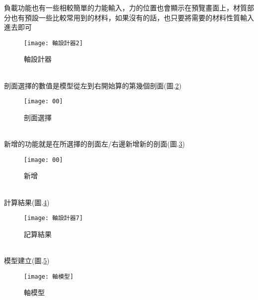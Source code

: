 \begin{itemize}
		負載功能也有一些相較簡單的力能輸入，力的位置也會顯示在預覽畫面上，材質部分也有預設一些比較常用到的材料，如果沒有的話，也只要將需要的材料性質輸入進去即可\\
		\begin{figure}[hbt!]
		\begin{center}
		\texttt{[image: 軸設計器2]}
		\caption{\Large 軸設計器}\label{軸設計器}
		\end{center}
		\end{figure}
		\\
		剖面選擇的數值是模型從左到右開始算的第幾個剖面(圖.\ref{剖面選擇})
		\begin{figure}[hbt!]
		\begin{center}
		\texttt{[image: 00]}
		\caption{\Large 剖面選擇}\label{剖面選擇}
		\end{center}
		\end{figure}
		\\
		新增的功能就是在所選擇的剖面左/右邊新增新的剖面(圖.\ref{2.8})\\
		\begin{figure}[hbt!]
		\begin{center}
		\texttt{[image: 00]}
		\caption{\Large 新增}\label{2.8}
		\end{center}
		\end{figure}
		\\
		計算結果(圖.\ref{2.9})
		\begin{figure}[hbt!]
		\begin{center}
		\texttt{[image: 軸設計器7]}
		\caption{\Large 記算結果}\label{2.9}
		\end{center}
		\end{figure}
		\\
		模型建立(圖.\ref{2.10})
		\begin{figure}[hbt!]
		\begin{center}
		\texttt{[image: 軸模型]}
		\caption{\Large 軸模型}\label{2.10}
		\end{center}
		\end{figure}
		\\
		
\newpage


\end{itemize}
